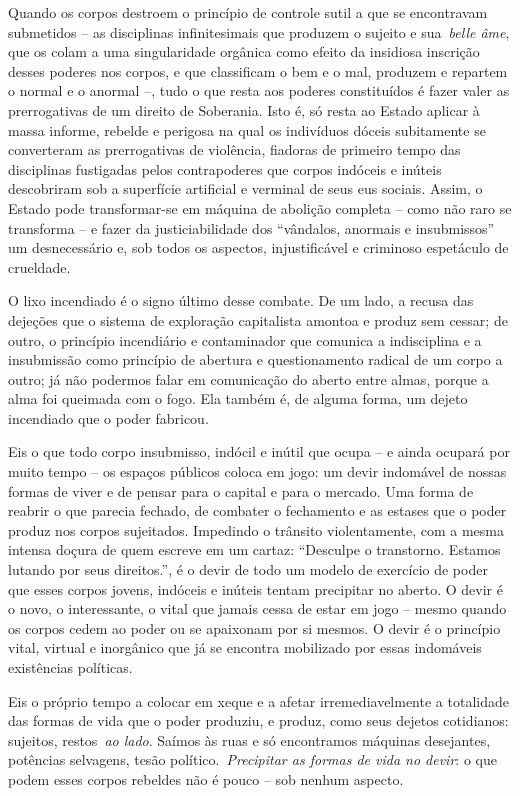 Quando os corpos destroem o princípio de controle sutil a que se
encontravam submetidos -- as disciplinas infinitesimais que produzem o
sujeito e sua~\emph{belle âme}, que os colam a uma singularidade
orgânica como efeito da insidiosa inscrição desses poderes nos corpos, e
que classificam o bem e o mal, produzem e repartem o normal e o anormal
--, tudo o que resta aos poderes constituídos é fazer valer as
prerrogativas de um direito de Soberania. Isto é, só resta ao Estado
aplicar à massa informe, rebelde e perigosa na qual os indivíduos dóceis
subitamente se converteram as prerrogativas de violência, fiadoras de
primeiro tempo das disciplinas fustigadas pelos contrapoderes que corpos
indóceis e inúteis descobriram sob a superfície artificial e verminal de
seus eus sociais. Assim, o Estado pode transformar-se em máquina de
abolição completa -- como não raro se transforma -- e fazer da
justiciabilidade dos ``vândalos, anormais e insubmissos'' um
desnecessário e, sob todos os aspectos, injustificável e criminoso
espetáculo de crueldade.

O lixo incendiado é o signo último desse combate. De um lado, a recusa
das dejeções que o sistema de exploração capitalista amontoa e produz
sem cessar; de outro, o princípio incendiário e contaminador que
comunica a indisciplina e a insubmissão como princípio de abertura e
questionamento radical de um corpo a outro; já não podermos falar em
comunicação do aberto entre almas, porque a alma foi queimada com o
fogo. Ela também é, de alguma forma, um dejeto incendiado que o poder
fabricou.

Eis o que todo corpo insubmisso, indócil e inútil que ocupa -- e ainda
ocupará por muito tempo -- os espaços públicos coloca em jogo: um devir
indomável de nossas formas de viver e de pensar para o capital e para o
mercado. Uma forma de reabrir o que parecia fechado, de combater o
fechamento e as estases que o poder produz nos corpos sujeitados.
Impedindo o trânsito violentamente, com a mesma intensa doçura de quem
escreve em um cartaz: ``Desculpe o transtorno. Estamos lutando por seus
direitos.'', é o devir de todo um modelo de exercício de poder que esses
corpos jovens, indóceis e inúteis tentam precipitar no aberto. O devir é
o novo, o interessante, o vital que jamais cessa de estar em jogo --
mesmo quando os corpos cedem ao poder ou se apaixonam por si mesmos. O
devir é o princípio vital, virtual e inorgânico que já se encontra
mobilizado por essas indomáveis existências políticas.

Eis o próprio tempo a colocar em xeque e a afetar irremediavelmente a
totalidade das formas de vida que o poder produziu, e produz, como seus
dejetos cotidianos: sujeitos, restos~\emph{ao lado}. Saímos às ruas e só
encontramos máquinas desejantes, potências selvagens, tesão
político.~\emph{Precipitar as formas de vida no devir}: o que podem
esses corpos rebeldes não é pouco -- sob nenhum aspecto.

